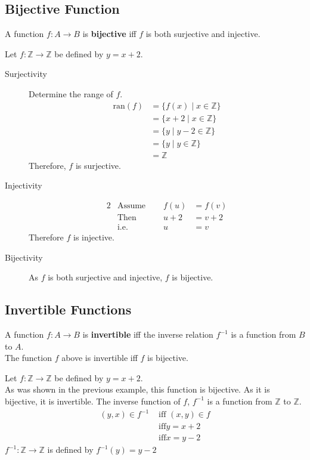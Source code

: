 \documentclass[../notes.tex]{subfiles}
\begin{document}
			\subsection{Bijective Function}
				A function $f: A \rightarrow B$ is \textbf{bijective} iff $f$ is both surjective and injective.
				\begin{example}
					Let $f: \mathbb{Z} \rightarrow \mathbb{Z}$ be defined by $y = x + 2$.
					\begin{description}
						\item[Surjectivity] Determine the range of $f$.
							\begin{align*}
								\mathrm{ran}(f) &= \{f(x) \mid x \in \mathbb{Z}\}\\
								&= \{x + 2 \mid x \in \mathbb{Z}\}\\
								&= \{y \mid y - 2 \in \mathbb{Z}\}\tag*{$x = y - 2$}\\
								&= \{y \mid y \in \mathbb{Z}\}\\
								&= \mathbb{Z}
							\end{align*}
							Therefore, $f$ is surjective.
						\item[Injectivity]
							\begin{alignat*}{2}
								&\text{Assume } \quad &f(u) &= f(v)\\
								&\text{Then } &u + 2 &= v + 2\\
								&\text{i.e.} &u &= v
							\end{alignat*}
							Therefore $f$ is injective.
						\item[Bijectivity] As $f$ is both surjective and injective, $f$ is bijective.
					\end{description}
				\end{example}
			\subsection{Invertible Functions}
				A function $f: A \rightarrow B$ is \textbf{invertible} iff the inverse relation $f^{-1}$ is a function from $B$ to $A$.\\
				The function $f$ above is invertible iff $f$ is bijective.
				\begin{example}
					Let $f: \mathbb{Z} \rightarrow \mathbb{Z}$ be defined by $y = x + 2$.\\
					As was shown in the previous example, this function is bijective. As it is bijective, it is invertible. The inverse function of $f$, $f^{-1}$ is a function from $\mathbb{Z}$ to $\mathbb{Z}$.
					\begin{align*}
						(y, x) \in f^{-1} &\text{ iff } (x, y) \in f\\
						& \text{ iff} y = x + 2\\
						& \text{ iff} x = y - 2
					\end{align*}
					$f^{-1}: \mathbb{Z} \rightarrow \mathbb{Z}$ is defined by $f^{-1}(y) = y - 2$
				\end{example}
\end{document}
